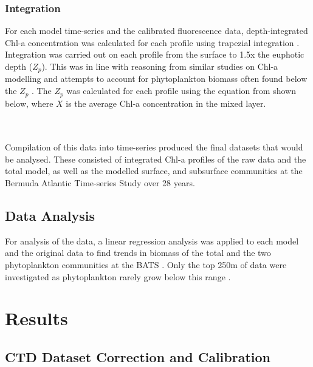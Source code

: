\documentclass{article}
\begin{document}
\subsubsection{Integration}
For each model time-series and the calibrated fluorescence data, depth-integrated Chl-a concentration was calculated for each profile using trapezial integration \citep{saba_challenges_2010}. Integration was carried out on each profile from the surface to 1.5x the euphotic depth ($Z_p$). This was in line with reasoning from similar studies on Chl-a modelling and attempts to account for phytoplankton biomass often found below the $Z_p$ \citep{saba_challenges_2010,brewin_modelling_2017,uitz_vertical_2006}. The $Z_p$ was calculated for each profile using the equation from \cite{morel_examining_2007} shown below, where $X$ is the average Chl-a concentration in the mixed layer.\\ \\
\begin{center}
\end{center}
\noindent
\\ Compilation of this data into time-series produced the final datasets that would be analysed. These consisted of integrated Chl-a profiles of the raw data and the total model, as well as the modelled surface, and subsurface communities at the Bermuda Atlantic Time-series Study over 28 years.
\subsection{Data Analysis}
For analysis of the data, a linear regression analysis was applied to each model and the original data to find trends in biomass of the total and the two phytoplankton communities at the BATS \citep{angelini_regression_2019}. Only the top 250m of data were investigated as phytoplankton rarely grow below this range \citep{cullen_subsurface_2015}.
\renewcommand{\floatpagefraction}{.88}%
\section{Results}
\subsection{CTD Dataset Correction and Calibration}
\end{document}
